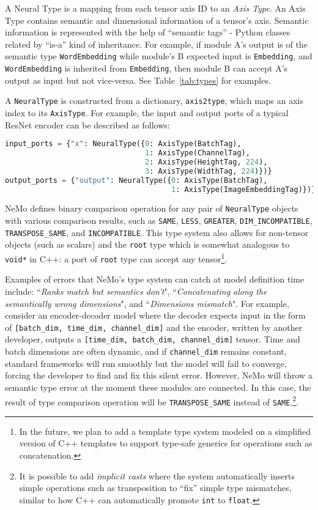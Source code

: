 \documentclass{article}
\begin{document}
A Neural Type is a mapping from each tensor axis ID to an \textit{Axis Type}. An Axis Type contains semantic and dimensional information of a tensor's axis. Semantic information is represented with the help of ``semantic tags'' - Python classes related by ``is-a'' kind of inheritance. For example, if module A's output is of the semantic type \texttt{WordEmbedding} while module's B expected input is \texttt{Embedding}, and \texttt{WordEmbedding} is inherited from \texttt{Embedding}, then module B can accept A's output as input but not vice-versa. See Table~\ref{tab:types} for examples.

A \texttt{NeuralType} is constructed from a dictionary, \texttt{axis2type}, which maps an axis index to its \texttt{AxisType}. For example, the input and output ports of a typical ResNet encoder can be described as follows:
\begin{lstlisting}[language=Python, basicstyle=\small]
input_ports = {"x": NeuralType({0: AxisType(BatchTag), 
                                1: AxisType(ChannelTag), 
                                2: AxisType(HeightTag, 224), 
                                3: AxisType(WidthTag, 224)})}
output_ports = {"output": NeuralType({0: AxisType(BatchTag), 
                                      1: AxisType(ImageEmbeddingTag)})}
\end{lstlisting}

NeMo defines binary comparison operation for any pair of \texttt{NeuralType} objects with various comparison results, such as \texttt{SAME}, \texttt{LESS}, \texttt{GREATER}, \texttt{DIM\_INCOMPATIBLE}, \texttt{TRANSPOSE\_SAME}, and \texttt{INCOMPATIBLE}. This type system also allows for non-tensor objects (such as scalars) and the \texttt{root} type which is somewhat analogous to \texttt{void*} in C++: a port of \texttt{root} type can accept any tensor\footnote{In the future, we plan to add a template type system modeled on a simplified version of C++ templates to support type-safe generics for operations such as concatenation.}.

Examples of errors that NeMo's type system can catch at model definition time include: ``\textit{Ranks match but semantics don't}", ``\textit{Concatenating along the semantically wrong dimensions}", and ``\textit{Dimensions mismatch}". For example, consider an encoder-decoder model where the decoder expects input in the form of \texttt{[batch\_dim, time\_dim, channel\_dim]} and the encoder, written by another developer, outputs a \texttt{[time\_dim, batch\_dim, channel\_dim]} tensor. Time and batch dimensions are often dynamic, and if \texttt{channel\_dim} remains constant, standard frameworks will run smoothly but the model will fail to converge, forcing the developer to find and fix this silent error. However, NeMo will throw a semantic type error at the moment these modules are connected. In this case, the result of type comparison operation will be \texttt{TRANSPOSE\_SAME} instead of \texttt{SAME}.\footnote{It is possible to add \textit{implicit casts} where the system automatically inserts simple operations such as transposition to ``fix'' simple type mismatches, similar to how C++ can automatically promote \texttt{int} to \texttt{float}.}.
\end{document}
